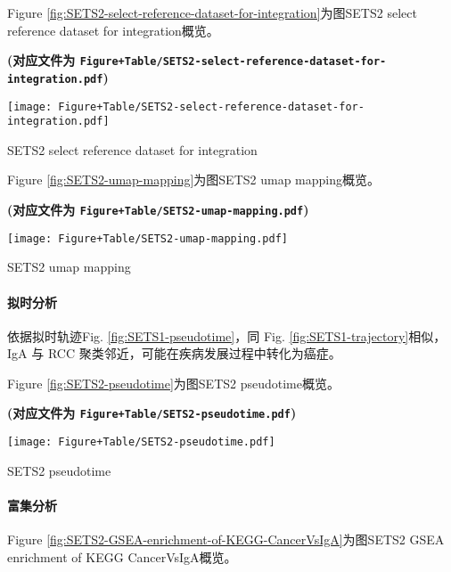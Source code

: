 \documentclass[
]{article}
\begin{document}
Figure \ref{fig:SETS2-select-reference-dataset-for-integration}为图SETS2 select reference dataset for integration概览。

\textbf{(对应文件为 \texttt{Figure+Table/SETS2-select-reference-dataset-for-integration.pdf})}

\def\@captype{figure}
\begin{center}
\texttt{[image: Figure+Table/SETS2-select-reference-dataset-for-integration.pdf]}
\caption{SETS2 select reference dataset for integration}\label{fig:SETS2-select-reference-dataset-for-integration}
\end{center}

Figure \ref{fig:SETS2-umap-mapping}为图SETS2 umap mapping概览。

\textbf{(对应文件为 \texttt{Figure+Table/SETS2-umap-mapping.pdf})}

\def\@captype{figure}
\begin{center}
\texttt{[image: Figure+Table/SETS2-umap-mapping.pdf]}
\caption{SETS2 umap mapping}\label{fig:SETS2-umap-mapping}
\end{center}

\hypertarget{ux62dfux65f6ux5206ux6790-1}{%
\paragraph{拟时分析}\label{ux62dfux65f6ux5206ux6790-1}}

依据拟时轨迹Fig. \ref{fig:SETS1-pseudotime}，同 Fig. \ref{fig:SETS1-trajectory}相似，IgA 与 RCC 聚类邻近，可能在疾病发展过程中转化为癌症。

Figure \ref{fig:SETS2-pseudotime}为图SETS2 pseudotime概览。

\textbf{(对应文件为 \texttt{Figure+Table/SETS2-pseudotime.pdf})}

\def\@captype{figure}
\begin{center}
\texttt{[image: Figure+Table/SETS2-pseudotime.pdf]}
\caption{SETS2 pseudotime}\label{fig:SETS2-pseudotime}
\end{center}

\hypertarget{ux5bccux96c6ux5206ux6790}{%
\paragraph{富集分析}\label{ux5bccux96c6ux5206ux6790}}

Figure \ref{fig:SETS2-GSEA-enrichment-of-KEGG-CancerVsIgA}为图SETS2 GSEA enrichment of KEGG CancerVsIgA概览。
\end{document}
